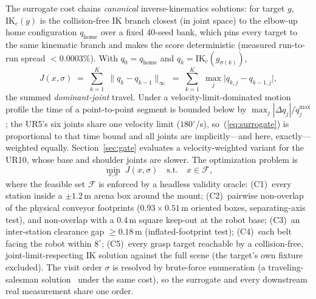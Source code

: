 \documentclass[conference]{IEEEtran}
\begin{document}
The surrogate cost chains \emph{canonical} inverse-kinematics solutions: for target $g$,
$\mathrm{IK}_c(g)$ is the collision-free IK branch closest (in joint space) to the elbow-up home
configuration $q_{\mathrm{home}}$ over a fixed 40-seed bank, which pins every target to the same
kinematic branch and makes the score deterministic (measured run-to-run spread
$<\!0.0003\%$). With $q_0=q_{\mathrm{home}}$ and $q_k=\mathrm{IK}_c\!\left(g_{\sigma(k)}\right)$,
\begin{equation}
\label{eq:surrogate}
J(x,\sigma)\;=\;\sum_{k=1}^{K}\;\bigl\lVert q_k-q_{k-1}\bigr\rVert_{\infty}
\;=\;\sum_{k=1}^{K}\;\max_{j}\bigl|q_{k,j}-q_{k-1,j}\bigr|,
\end{equation}
the summed \emph{dominant-joint} travel. Under a velocity-limit-dominated motion profile the
time of a point-to-point segment is bounded below by $\max_j |\Delta q_j|/\dot q_j^{\max}$; the
UR5's six joints share one velocity limit ($180^\circ$/s), so~(\ref{eq:surrogate}) is
proportional to that time bound and all joints are implicitly---and here, exactly---weighted
equally. Section~\ref{sec:gate} evaluates a velocity-weighted variant for the UR10, whose base
and shoulder joints are slower. The optimization problem is
\begin{equation}
\label{eq:problem}
\min_{x,\sigma} \; J(x,\sigma) \quad \text{s.t.} \quad x \in \mathcal{F},
\end{equation}
where the feasible set $\mathcal{F}$ is enforced by a headless validity oracle:
(C1)~every station inside a $\pm1.2$\,m arena box around the mount; (C2)~pairwise non-overlap of
the physical conveyor footprints ($0.93\times0.51$\,m oriented boxes, separating-axis test), and
non-overlap with a $0.4$\,m square keep-out at the robot base; (C3)~an inter-station clearance
gap $\geq0.18$\,m (inflated-footprint test); (C4)~each belt facing the robot within $8^\circ$;
(C5)~every grasp target reachable by a collision-free, joint-limit-respecting IK solution
against the full scene (the target's own fixture excluded). The visit order $\sigma$ is resolved
by brute-force enumeration (a traveling-salesman solution~\cite{tsp} under the same cost), so
the surrogate and every downstream real measurement share one order.
\end{document}

